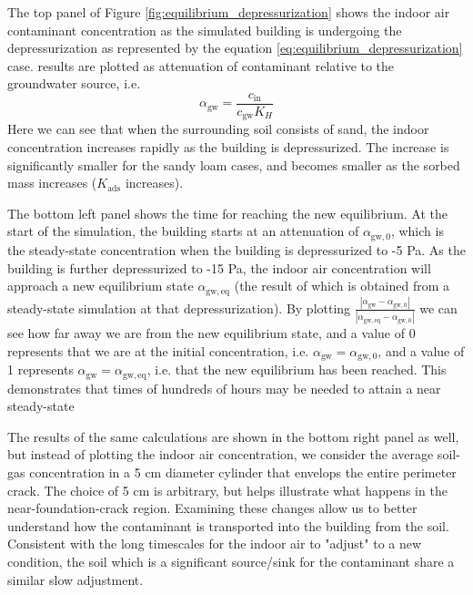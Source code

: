 The top panel of Figure \ref{fig:equilibrium_depressurization} shows the indoor air contaminant concentration as the simulated building is undergoing the depressurization as represented by the equation \eqref{eq:equilibrium_depressurization} case.
results are plotted as attenuation of contaminant relative to the groundwater source, i.e.
\begin{equation}
  \alpha_\mathrm{gw} = \frac{c_\mathrm{in}}{c_\mathrm{gw} K_H}
\end{equation}
Here we can see that when the surrounding soil consists of sand, the indoor concentration increases rapidly as the building is depressurized.
The increase is significantly smaller for the sandy loam cases, and becomes smaller as the sorbed mass increases ($K_\mathrm{ads}$ increases).\par

The bottom left panel shows the time for reaching the new equilibrium.
At the start of the simulation, the building starts at an attenuation of $\alpha_\mathrm{gw,0}$, which is the steady-state concentration when the building is depressurized to -5 Pa.
As the building is further depressurized to -15 Pa, the indoor air concentration will approach a new equilibrium state $\alpha_\mathrm{gw,eq}$ (the result of which is obtained from a steady-state simulation at that depressurization).
By plotting $\frac{|\alpha_\mathrm{gw}-\alpha_\mathrm{gw,0}|}{|\alpha_\mathrm{gw,eq}-\alpha_\mathrm{gw,0}|}$ we can see how far away we are from the new equilibrium state, and a value of 0 represents that we are at the initial concentration, i.e. $\alpha_\mathrm{gw} = \alpha_\mathrm{gw,0}$, and a value of 1 represents $\alpha_\mathrm{gw} = \alpha_\mathrm{gw,eq}$, i.e. that the new equilibrium has been reached.
This demonstrates that times of hundreds of hours may be needed to attain a near steady-state\par

The results of the same calculations are shown in the bottom right panel as well, but instead of plotting the indoor air concentration, we consider the average soil-gas concentration in a 5 cm diameter cylinder that envelops the entire perimeter crack.
The choice of 5 cm is arbitrary, but helps illustrate what happens in the near-foundation-crack region.
Examining these changes allow us to better understand how the contaminant is transported into the building from the soil.
Consistent with the long timescales for the indoor air to "adjust" to a new condition, the soil which is a significant source/sink for the contaminant share a similar slow adjustment.\par

